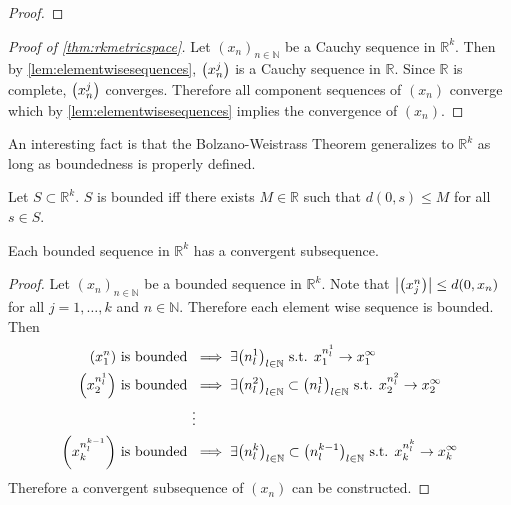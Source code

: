 \documentclass[../notes.tex]{subfiles}
\begin{document}
\begin{proof}
\end{proof}

\begin{proof}[Proof of \ref{thm:rkmetricspace}]
    Let $(x_n)_{n\in \mathbb{N}}$ be a Cauchy sequence in $\mathbb{R}^k$. Then by \ref{lem:elementwisesequences}, $\qty(x_n^j)$ is a Cauchy sequence in $\mathbb{R}$. Since $\mathbb{R}$ is complete, $\qty(x_n^j)$ converges. Therefore all component sequences of $(x_n)$ converge which by \ref{lem:elementwisesequences} implies the convergence of $(x_n)$.
\end{proof}

An interesting fact is that the Bolzano-Weistrass Theorem generalizes to $\mathbb{R}^k$ as long as boundedness is properly defined.

\begin{definition}
    Let $S \subset \mathbb{R}^k$. $S$ is bounded iff there exists $M \in \mathbb{R}$ such that $d(0,s) \leq M$ for all $s \in S$.
\end{definition}

\begin{theorem}
    Each bounded sequence in $\mathbb{R}^k$ has a convergent subsequence.
\end{theorem}

\begin{proof}
    Let $(x_n)_{n\in \mathbb{N}}$ be a bounded sequence in $\mathbb{R}^k$. Note that $\qty|\qty(x^n_j)| \leq d(0,x_n)$ for all $j = 1,\ldots,k$ and $n \in \mathbb{N}$. Therefore each element wise sequence is bounded. Then
    \begin{align*}
        \qty(x^n_1) \text{ is bounded } &\implies \exists \qty(n_l^1)_{l \in \mathbb{N}} \text{ s.t. } x_1^{n^1_l} \to x_1^\infty \\
        \qty(x^{n_l^1}_2) \text{ is bounded } &\implies \exists \qty(n_l^2)_{l \in \mathbb{N}} \subset \qty(n_l^1)_{l \in \mathbb{N}} \text{ s.t. } x_2^{n^2_l} \to x_2^\infty \\
                                        &\vdots \\
        \qty(x^{n_l^{k-1}}_k) \text{ is bounded } &\implies \exists \qty(n_l^k)_{l \in \mathbb{N}} \subset \qty(n_l^{k-1})_{l \in \mathbb{N}} \text{ s.t. } x_k^{n^k_l} \to x_k^\infty \\
    \end{align*}
    Therefore a convergent subsequence of $(x_n)$ can be constructed.
\end{proof}
\end{document}
